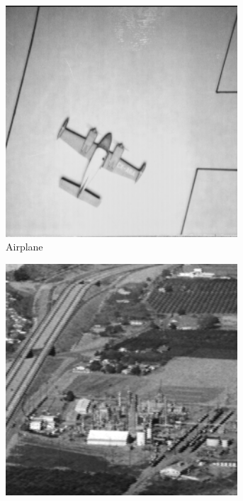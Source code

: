 \begin{figure}
\begin{subfigure}[b]{.3\textwidth}
  \includegraphics[width=0.95\textwidth]{figures/test-images/original/airplane}
  \caption{Airplane}
  \label{fig:test-images-airplane}
\end{subfigure}
\begin{subfigure}[b]{.3\textwidth}
  \centering
  \includegraphics[width=0.95\textwidth]{figures/test-images/original/chemicalplant}

\end{subfigure}
\end{figure}
